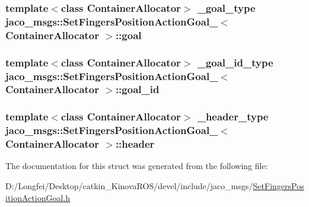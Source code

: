 \subsubsection[{\texorpdfstring{goal}{goal}}]{\setlength{\rightskip}{0pt plus 5cm}template$<$class Container\+Allocator$>$ {\bf \+\_\+goal\+\_\+type} {\bf jaco\+\_\+msgs\+::\+Set\+Fingers\+Position\+Action\+Goal\+\_\+}$<$ Container\+Allocator $>$\+::goal}\hypertarget{structjaco__msgs_1_1SetFingersPositionActionGoal___a813e7ec249b22368dc97bde83fa86fb0}{}\label{structjaco__msgs_1_1SetFingersPositionActionGoal___a813e7ec249b22368dc97bde83fa86fb0}
\subsubsection[{\texorpdfstring{goal\+\_\+id}{goal_id}}]{\setlength{\rightskip}{0pt plus 5cm}template$<$class Container\+Allocator$>$ {\bf \+\_\+goal\+\_\+id\+\_\+type} {\bf jaco\+\_\+msgs\+::\+Set\+Fingers\+Position\+Action\+Goal\+\_\+}$<$ Container\+Allocator $>$\+::goal\+\_\+id}\hypertarget{structjaco__msgs_1_1SetFingersPositionActionGoal___a261bcecfa80d718de47ac2c4c3a479fb}{}\label{structjaco__msgs_1_1SetFingersPositionActionGoal___a261bcecfa80d718de47ac2c4c3a479fb}
\subsubsection[{\texorpdfstring{header}{header}}]{\setlength{\rightskip}{0pt plus 5cm}template$<$class Container\+Allocator$>$ {\bf \+\_\+header\+\_\+type} {\bf jaco\+\_\+msgs\+::\+Set\+Fingers\+Position\+Action\+Goal\+\_\+}$<$ Container\+Allocator $>$\+::header}\hypertarget{structjaco__msgs_1_1SetFingersPositionActionGoal___aaaa32a1863202d0223d4e50696b4c64b}{}\label{structjaco__msgs_1_1SetFingersPositionActionGoal___aaaa32a1863202d0223d4e50696b4c64b}


The documentation for this struct was generated from the following file\+:\begin{DoxyCompactItemize}
\item 
D\+:/\+Longfei/\+Desktop/catkin\+\_\+\+Kinova\+R\+O\+S/devel/include/jaco\+\_\+msgs/\hyperlink{SetFingersPositionActionGoal_8h}{Set\+Fingers\+Position\+Action\+Goal.\+h}\end{DoxyCompactItemize}

